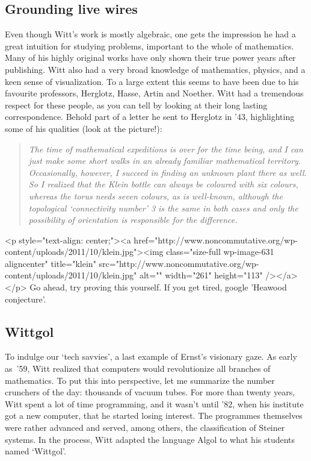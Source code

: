 \subsection{Grounding live wires}
Even though Witt's work is mostly algebraic, one gets the impression he had a great intuition for studying problems, important to the whole of mathematics. Many of his highly original works have only shown their true power years after publishing. Witt also had a very broad knowledge of mathematics, physics, and a keen sense of visualization. To a large extent this seems to have been due to his favourite professors, Herglotz, Hasse, Artin and Noether. Witt had a tremendous respect for these people, as you can tell by looking at their long lasting correspondence. Behold part of a letter he sent to Herglotz in '43, highlighting some of his qualities (look at the picture!):
\begin{quote}
  \textsl{The time of mathematical expeditions is over for the time being, and I can just make some short walks in an already familiar mathematical territory. Occasionally, however, I succeed in finding an unknown plant there as well. So I realized that the Klein bottle can always be coloured with six colours, whereas the torus needs seven colours, as is well-known, although the topological `connectivity number' 3 is the same in both cases and only the possibility of orientation is responsible for the difference.}
\end{quote}
<p style="text-align: center;"><a href="http://www.noncommutative.org/wp-content/uploads/2011/10/klein.jpg"><img class="size-full wp-image-631 aligncenter" title="klein" src="http://www.noncommutative.org/wp-content/uploads/2011/10/klein.jpg" alt="" width="261" height="113" /></a></p>
Go ahead, try proving this yourself. If you get tired, google 'Heawood conjecture'.


\subsection{Wittgol}
To indulge our `tech savvies', a last example of Ernst's visionary gaze. As early as~'59, Witt realized that computers would revolutionize all branches of mathematics. To put this into perspective, let me summarize the number crunchers of the day: thousands of vacuum tubes. For more than twenty years, Witt spent a lot of time programming, and it wasn't until '82, when his institute got a new computer, that he started losing interest. The programmes themselves were rather advanced and served, among others, the classification of Steiner systems. In the process, Witt adapted the language Algol to what his students named `Wittgol'.

